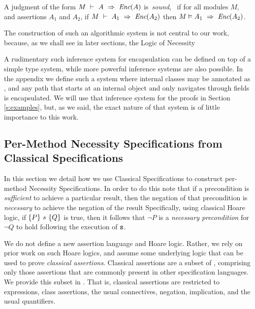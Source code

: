 \begin{definition}
\label{lem:encap-soundness}
A judgment of the form $M\ \vdash\ A\ \Rightarrow\ \textit{Enc}(A)$  is\  \emph{sound}, \ if 
for all modules $M$, and assertions $A_1$ and $A_2$, if 
$M\ \vdash\ A_1\ \Rightarrow\ \textit{Enc}(A_2)$ then $M \vDash A_1\ \Rightarrow\ \textit{Enc}(A_2)$.
\end{definition}


The construction of such an algorithmic system is not central to our work,
because, as we shall see in later sections,  the Logic of Necessity 

A rudimentary such inference system for encapsulation 
can be defined on top of a simple type system, while 
more powerful inference systems are also possible. 
In the appendix we define such a system where internal classes
may be annotated as , and any path that starts at an internal object and
only navigates through  fields is encapsulated. 
We will use that inference system for the proofs in Section \ref{s:examples}, but, as
we said, the exact nature of that system is of little importance to this work. 


\subsection{Per-Method Necessity Specifications from Classical Specifications}
\label{s:classical-proof}
In this section we detail how we use Classical Specifications
to construct per-method Necessity Specifications. 
In order to do this
note that if a precondition  is \emph{sufficient}
to achieve a particular result, then the negation of that precondition
is \emph{necessary} to achieve the negation of the result  
Specifically, 
using classical Hoare logic, if $\{P\}\ {{s}}\ \{Q\}$ is true, then 
it follows that $\neg P$ is a \emph{necessary precondition} for $\neg Q$ to 
hold following the execution of ${\texttt{s}}$.

We do not define a new assertion language and Hoare logic.
 Rather, we rely on prior work on such Hoare logics,
  and assume some underlying logic that can be used 
to prove  \emph{classical assertions}. 
Classical assertions are a subset of \SpecO, comprising only those 
assertions that are commonly present in other specification languages.
We provide this subset in . That is, classical assertions
are restricted to expressions, class assertions, the usual connectives, negation, 
implication, and the usual quantifiers.


